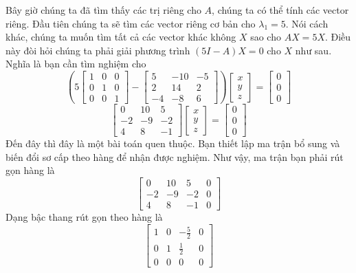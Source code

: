 Bây giờ chúng ta đã tìm thấy các trị riêng cho $A$, chúng ta có thể tính các vector riêng.
Đầu tiên chúng ta sẽ tìm các vector riêng cơ bản cho $\lambda_{1}=5$. Nói cách khác, chúng ta muốn tìm tất cả các vector khác không $X$ sao cho $AX=5X$. Điều này đòi hỏi chúng ta phải giải phương trình $(5I-A)X=0$ cho $X$ như sau.
Nghĩa là bạn cần tìm nghiệm cho
\begin{equation*}
\left(5\begin{bmatrix}1&0&0\\ 0&1&0\\ 0&0&1\end{bmatrix}-\begin{bmatrix}5&-10&-5\\ 2&14&2\\ -4&-8&6\end{bmatrix}\right)\begin{bmatrix}x\\ y\\ z\end{bmatrix}=\begin{bmatrix}0\\ 0\\ 0\end{bmatrix}
\end{equation*}
\begin{equation*}
\begin{bmatrix}0&10&5\\ -2&-9&-2\\ 4&8&-1\end{bmatrix}\begin{bmatrix}x\\ y\\ z\end{bmatrix}=\begin{bmatrix}0\\ 0\\ 0\end{bmatrix}
\end{equation*}
Đến đây thì đây là một bài toán quen thuộc. Bạn thiết lập ma trận bổ sung và biến đổi sơ cấp theo hàng để nhận được nghiệm. Như vậy, ma trận bạn phải rút gọn hàng là
\begin{equation*}
\begin{bmatrix}0&10&5&0\\ -2&-9&-2&0\\ 4&8&-1&0\end{bmatrix}
\end{equation*}
Dạng bậc thang rút gọn theo hàng là
\begin{equation*}
\begin{bmatrix}1&0&-\frac{5}{2}&0\\ 0&1&\frac{1}{2}&0\\ 0&0&0&0\end{bmatrix}
\end{equation*}
